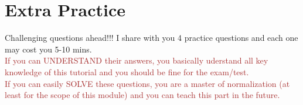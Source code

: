\section*{Extra Practice}

\begin{frame}[fragile]{}
	Challenging questions ahead!!! I share with you 4 practice questions and each one may cost you 5-10 mins.\\\vspace{10pt}
	\textcolor{brown}{If you can UNDERSTAND their answers, you basically uderstand all key knowledge of this tutorial and you should be fine for the exam/test.}\\\vspace{10pt}
	\textcolor{brown}{If you can easily SOLVE these questions, you are a master of normalization (at least for the scope of this module) and you can teach this part in the future.}\\
	

\end{frame}
